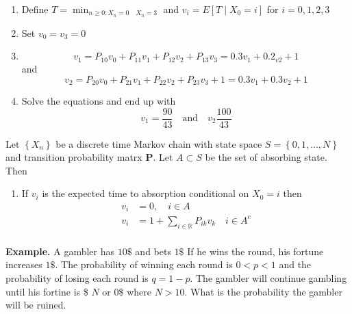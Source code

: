 \documentclass{article}
\theoremstyle{remark}
\begin{document}
\begin{enumerate}
  \item Define $T  = \min_{ n\ge 0 : X_{n} = 0 \quad X_{n} = 3 } $ and $v_{i} = E \left[ T  \mid  X_{0} = i \right] $ for $i  = 0,1,2,3 $
  \item Set $v_{0} = v_{3} = 0$
  \item \[
  v_{1} = P_{10} v_{0} + P_{11} v_{1} + P_{12} v_{2} + P_{13} v_{3}  = 0.3 v_{1} + 0.2_{v2} +1
  \] 
  and \[
  v_{2} = P_{20 } v_{0}  + P_{21} v_{1} + P_{22}v_{2} + P_{23 } v_{3} + 1 = 0.3 v_{1} + 0.3 v_{2} + 1
  \] 
\item Solve the equations and end up with \[
v_{1} = \frac{90}{43} \quad \text{and} \quad v_{2} \frac{100}{43}  
\] 

\end{enumerate}


\begin{theorem}
  Let $\left\{ X_{n} \right\}$ be a discrete time Markov chain with state space $S = \left\{ 0, 1, \ldots , N \right\} $ and transition probability matrx $\mathbf{P}$. Let $A \subset S$ be the set of absorbing state. Then
  \begin{enumerate}
    \item If $v_{i}$ is the expected time to absorption conditional on $X_{0} = i$ then \[
    \begin{split}
      v_{i}  & = 0, \quad  i \in  A   \\
      v_{i} &=  1+ \sum_{ i \in  \mathbb{R} }^{} P_{ik} v_{k} \quad i \in  A^{c}  \\
    \end{split} 
    \] 
  \end{enumerate}
\end{theorem}


\textbf{Example.} 
A gambler has $10 \$$ and bets  $1\$$  If he wins the round, his fortune increases $ 1 \$$.  The probability of winning each round is  $ 0  < p < 1$ and the probability of losing each round is $q = 1 - p$. The gambler will continue gambling until his fortine is \$ $N$ or $0 \$$ where  $N > 10$. What is the probability the gambler will be ruined. 
\end{document}
